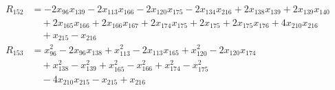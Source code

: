 \begin{align*}
R_{152}&=-2x_{96}x_{139}-2x_{113}x_{166}-2x_{120}x_{175}-2x_{134}x_{216}+2x_{138}x_{139}+2x_{139}x_{140}\\
&\quad{}+2x_{165}x_{166}+2x_{166}x_{167}+2x_{174}x_{175}+2x_{175}+2x_{175}x_{176}+4x_{210}x_{216}\\
&\quad{}+x_{215}-x_{216}\\
R_{153}&=x_{96}^{2}-2x_{96}x_{138}+x_{113}^{2}-2x_{113}x_{165}+x_{120}^{2}-2x_{120}x_{174}\\
&\quad{}+x_{138}^{2}-x_{139}^{2}+x_{165}^{2}-x_{166}^{2}+x_{174}^{2}-x_{175}^{2}\\
&\quad{}-4x_{210}x_{215}-x_{215}+x_{216}\\
\end{align*}
\endgroup
